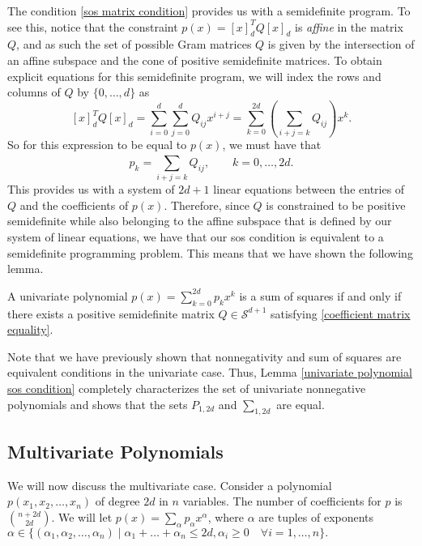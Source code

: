 	The condition \eqref{sos matrix condition} provides us with a semidefinite program. To see this, notice that the constraint $p(x) = [x]_d^T Q [x]_d$ is \emph{affine} in the matrix $Q$, and as such the set of possible Gram matrices $Q$ is given by the intersection of an affine subspace and the cone of positive semidefinite matrices. To obtain explicit equations for this semidefinite program, we will index the rows and columns of $Q$ by $\{0, \dots, d\}$ as 
	$$
	[x]_d^T Q [x]_d = \sum_{i=0}^{d} \sum_{j=0}^{d} Q_{ij} x^{i+j}= \sum_{k = 0}^{2d} \left( \sum_{i+j = k}^{} Q_{ij} \right) x^k.
	$$
	So for this expression to be equal to $p(x)$, we must have that 
	\begin{equation} \label{coefficient matrix equality}
		p_k = \sum_{i + j = k}^{} Q_{ij}, \qquad k = 0, \dots, 2d.
	\end{equation}
	This provides us with a system of $2d+1$ linear equations between the entries of $Q$ and the coefficients of $p(x)$. Therefore, since $Q$ is constrained to be positive semidefinite while also belonging to the affine subspace that is defined by our system of linear equations, we have that our sos condition is equivalent to a semidefinite programming problem. This means that we have shown the following lemma. 
	\begin{lemma} \label{univariate polynomial sos condition}
		A univariate polynomial $p(x) = \sum_{k=0}^{2d} p_k x^k$ is a sum of squares if and only if there exists a positive semidefinite matrix $Q \in \mathcal{S}^{d+1}$ satisfying \eqref{coefficient matrix equality}.
	\end{lemma}
	Note that we have previously shown that nonnegativity and sum of squares are equivalent conditions in the univariate case. Thus, Lemma \ref{univariate polynomial sos condition} completely characterizes the set of univariate nonnegative polynomials and shows that the sets $P_{1, 2d}$ and $\sum_{1, 2d}$ are equal. 
	
	\subsection{Multivariate Polynomials}
	
	We will now discuss the multivariate case. Consider a polynomial $p(x_1, x_2, \dots, x_n)$ of degree $2d$ in $n$ variables. The number of coefficients for $p$ is $\binom{n+2d}{2d}$. We will let $p(x) = \sum_{\alpha} p_{\alpha} x^{\alpha}$, where $\alpha$ are tuples of exponents $\alpha \in \{ (\alpha_1 , \alpha_2, \dots, \alpha_n) \mid \alpha_1 + \dots + \alpha_n \leq 2d, \alpha_i \geq 0 \quad \forall i = 1, \dots, n \}.$
	
